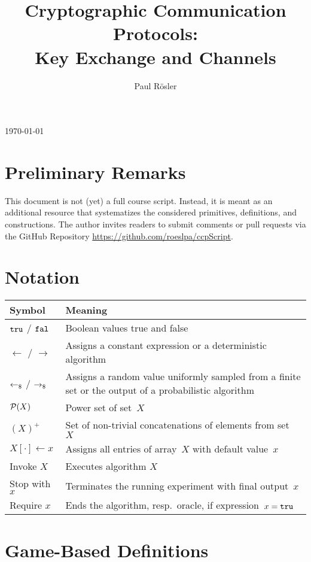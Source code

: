 \documentclass[a4paper,orivec]{llncs}
\title{Cryptographic Communication Protocols:\\Key Exchange and Channels}
\author{Paul Rösler}
\institute{FAU Erlangen-Nürnberg}
\begin{document}
\maketitle
\begin{center}
    \today
\end{center}

\begingroup
\let\clearpage\relax
\tableofcontents
\endgroup

\section{Preliminary Remarks}
This document is not (yet) a full course script.
Instead, it is meant as an additional resource that systematizes the considered primitives, definitions, and constructions.
The author invites readers to submit comments or pull requests via the GitHub Repository \url{https://github.com/roeslpa/ccpScript}.


\section{Notation}

\begin{tabular}{|l|p{13cm}|}\hline
    \textbf{Symbol} & \textbf{Meaning}\\\hline
    $\mathtt{tru}$ / $\mathtt{fal}$ & Boolean values true and false\\
    $\gets$ / $\to$ & Assigns a constant expression or a deterministic algorithm\\
    $\getsr$ / $\tor$ & Assigns a random value uniformly sampled from a finite set or the output of a probabilistic algorithm\\
    $\mathcal{P}(X)$ & Power set of set~$X$\\
    $(X)^+$ & Set of non-trivial concatenations of elements from set~$X$\\
    $X[\cdot]\gets x$ & Assigns all entries of array~$X$ with default value~$x$\\
    Invoke $X$ & Executes algorithm $X$\\
    Stop with $x$ & Terminates the running experiment with final output~$x$\\
    Require $x$ & Ends the algorithm, resp.~oracle, if expression~$x=\mathtt{tru}$\\\hline
\end{tabular}

\section{Game-Based Definitions}
\end{document}
